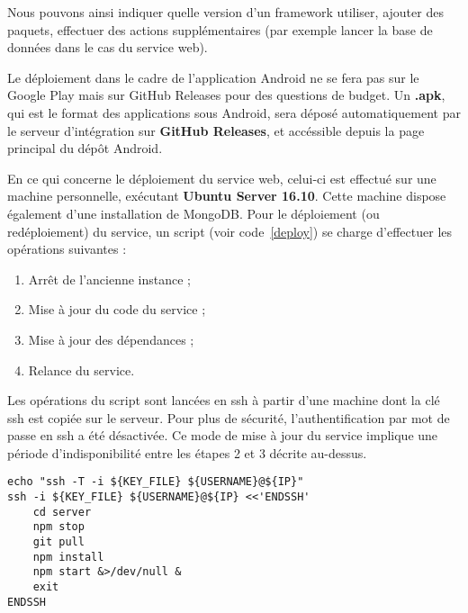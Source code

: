 Nous pouvons ainsi indiquer quelle version d'un framework utiliser, ajouter des paquets, effectuer des actions supplémentaires (par exemple lancer la base de données dans le cas du service web).

Le déploiement dans le cadre de l’application Android ne se fera pas sur le Google Play mais sur GitHub Releases pour des questions de budget. Un \textbf{.apk}, qui est le format des applications sous Android, sera déposé automatiquement par le serveur d’intégration sur \textbf{GitHub Releases}, et accéssible depuis la page principal du dépôt Android.

En ce qui concerne le déploiement du service web, celui-ci est effectué sur une machine personnelle, exécutant \textbf{Ubuntu Server 16.10}. Cette machine dispose également d'une installation de MongoDB. Pour le déploiement (ou redéploiement) du service, un script (voir code~\ref{deploy}) se charge d'effectuer les opérations suivantes :
\begin{enumerate}
    \item Arrêt de l'ancienne instance ;
    \item Mise à jour du code du service ;
    \item Mise à jour des dépendances ;
    \item Relance du service.
\end{enumerate}

Les opérations du script sont lancées en ssh à partir d'une machine dont la clé ssh est copiée sur le serveur. Pour plus de sécurité, l'authentification par mot de passe en ssh a été désactivée. Ce mode de mise à jour du service implique une période d'indisponibilité entre les étapes 2 et 3 décrite au-dessus.

\lstset{language=sh}
\begin{lstlisting}[caption=Script de déploiement du service, label=deploy]
echo "ssh -T -i ${KEY_FILE} ${USERNAME}@${IP}"
ssh -i ${KEY_FILE} ${USERNAME}@${IP} <<'ENDSSH'
    cd server
    npm stop
    git pull
    npm install
    npm start &>/dev/null &
    exit
ENDSSH
\end{lstlisting}
